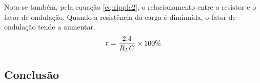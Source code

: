 \documentclass[12pt,a4paper]{article}
\begin{document}
Nota-se também, pela equação \ref{eq:ripple2}, o relacionamento entre o resistor e o fator de ondulação. Quando a resistência da carga é diminuída, o fator de ondulação tende a aumentar. 
        \begin{align}
            \centering
            \label{eq:ripple2}
            r = \frac{2.4}{R_L C}\times 100\%
        \end{align}        
\newpage
\subsection{Conclusão} 
\end{document}
